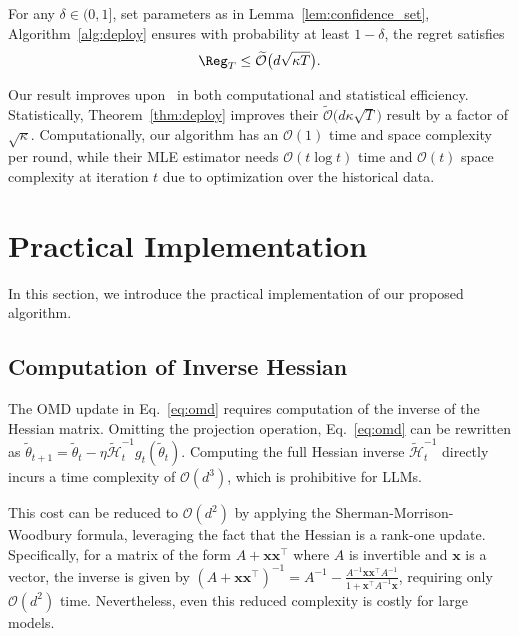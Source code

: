\begin{myThm}
    \label{thm:deploy}
    For any $\delta \in (0,1]$, set parameters as in Lemma~\ref{lem:confidence_set}, Algorithm~\ref{alg:deploy} ensures with probability at least $1-\delta$, the regret satisfies
    \begin{align*}
      {\Reg}_T \leq \widetilde{\mathcal{O}} \big(d\sqrt{{\kappa}{T}}\big).
    \end{align*}
\end{myThm}
\begin{myRemark}
  Our result improves upon~\citet{AISTATS'23:Saha-Dueling-RL} in both computational and statistical efficiency. Statistically, Theorem~\ref{thm:deploy} improves their $\widetilde{\mathcal{O}} \big(d{\kappa}\sqrt{{T}}\big)$ result by a factor of $\sqrt{\kappa}$. Computationally, our algorithm has an $\mathcal{O}(1)$ time and space complexity per round, while their MLE estimator needs $\mathcal{O}(t \log t)$ time and $\mathcal{O}(t)$ space complexity at iteration $t$ due to optimization over the historical data.
\end{myRemark}


\section{Practical Implementation}
\label{sec:practical}
In this section, we introduce the practical implementation of our proposed algorithm.

\subsection{Computation of Inverse Hessian}
The OMD update in Eq.~\eqref{eq:omd} requires computation of the inverse of the Hessian matrix. Omitting the projection operation, Eq.~\eqref{eq:omd} can be rewritten as $\widetilde{\theta}_{t+1} = \widetilde{\theta}_t - \eta \widetilde{\mathcal{H}}_t^{-1}g_t(\widetilde{\theta}_t)$. Computing the full Hessian inverse $\widetilde{\mathcal{H}}_t^{-1}$ directly incurs a time complexity of $\mathcal{O}(d^3)$, which is prohibitive for LLMs.

This cost can be reduced to $\mathcal{O}(d^2)$ by applying the Sherman-Morrison-Woodbury formula, leveraging the fact that the Hessian is a rank-one update. Specifically, for a matrix of the form $A + \mathbf{x}\mathbf{x}^\top$ where $A$ is invertible and $\mathbf{x}$ is a vector, the inverse is given by $(A + \mathbf{x} \mathbf{x}^\top)^{-1} = A^{-1} - \frac{A^{-1} \mathbf{x} \mathbf{x}^\top A^{-1}}{1 + \mathbf{x}^\top A^{-1} \mathbf{x}}$, requiring only $\mathcal{O}(d^2)$ time. Nevertheless, even this reduced complexity is costly for large models.

